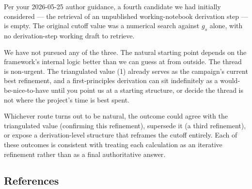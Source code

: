 \documentclass[
  11pt,
]{article}
\begin{document}
Per your 2026-05-25 author guidance, a fourth candidate we had initially
considered --- the retrieval of an unpublished working-notebook
derivation step --- is empty. The original cutoff value was a numerical
search against \(g_s\) alone, with no derivation-step working draft to
retrieve.

We have not pursued any of the three. The natural starting point depends
on the framework's internal logic better than we can guess at from
outside. The thread is non-urgent. The triangulated value (1) already
serves as the campaign's current best refinement, and a first-principles
derivation can sit indefinitely as a would-be-nice-to-have until you
point us at a starting structure, or decide the thread is not where the
project's time is best spent.

Whichever route turns out to be natural, the outcome could agree with
the triangulated value (confirming this refinement), supersede it (a
third refinement), or expose a derivation-level structure that reframes
the cutoff entirely. Each of these outcomes is consistent with treating
each calculation as an iterative refinement rather than as a final
authoritative answer.

\hypertarget{references}{%
\subsection{References}\label{references}}
\end{document}
